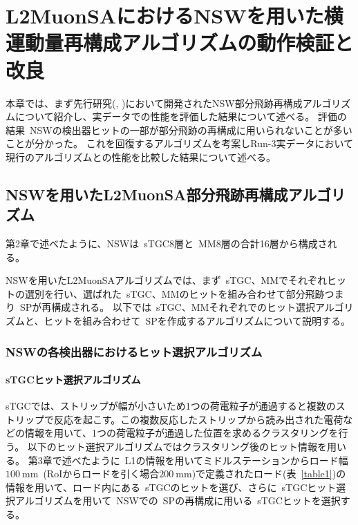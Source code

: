\chapter{L2MuonSAにおけるNSWを用いた横運動量再構成アルゴリズムの動作検証と改良}\label{chapter5}


本章では、まず先行研究(\cite{article:kumaoka}, \cite{article:noguchi})において開発されたNSW部分飛跡再構成アルゴリズムについて紹介し、実データでの性能を評価した結果について述べる。
評価の結果~NSWの検出器ヒットの一部が部分飛跡の再構成に用いられないことが多いことが分かった。
これを回復するアルゴリズムを考案しRun-3実データにおいて現行のアルゴリズムとの性能を比較した結果について述べる。


\section{NSWを用いたL2MuonSA部分飛跡再構成アルゴリズム}\label{chapter5-1}
第2章で述べたように、NSWは~sTGC8層と~MM8層の合計16層から構成される。

NSWを用いたL2MuonSAアルゴリズムでは、まず~sTGC、MMでそれぞれヒットの選別を行い、選ばれた~sTGC、MMのヒットを組み合わせて部分飛跡つまり~SPが再構成される。
以下では~sTGC、MMそれぞれでのヒット選択アルゴリズムと、ヒットを組み合わせて~SPを作成するアルゴリズムについて説明する。

\subsection{NSWの各検出器におけるヒット選択アルゴリズム}\label{chapter5-1-1}
\subsubsection{sTGCヒット選択アルゴリズム}
sTGCでは、ストリップが幅が小さいため1つの荷電粒子が通過すると複数のストリップで反応を起こす。この複数反応したストリップから読み出された電荷などの情報を用いて、1つの荷電粒子が通過した位置を求めるクラスタリングを行う。
以下のヒット選択アルゴリズムではクラスタリング後のヒット情報を用いる。
第3章で述べたように~L1の情報を用いてミドルステーションからロード幅~$\SI{100}{\mm}$~(RoIからロードを引く場合$\SI{200}{\mm}$)で定義されたロード(表~\ref{table1})の情報を用いて、ロード内にある~sTGCのヒットを選び、さらに~sTGCヒット選択アルゴリズムを用いて~NSWでの~SPの再構成に用いる~sTGCヒットを選択する。

